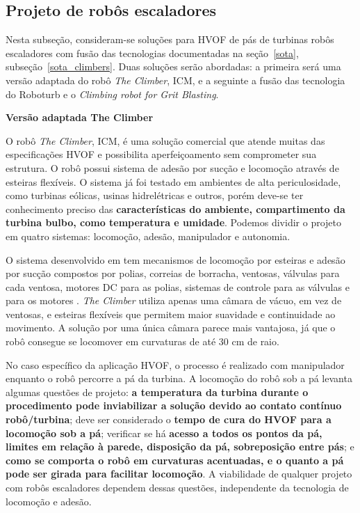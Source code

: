 \subsection{Projeto de robôs escaladores}\label{proj_climbers}

Nesta subseção, consideram-se soluções para HVOF de pás de turbinas robôs
escaladores com fusão das tecnologias documentadas na
seção~\ref{sota}, subseção~\ref{sota_climbers}. Duas soluções serão abordadas:
a primeira será uma versão adaptada do robô \emph{The Climber}, ICM, e a
seguinte a fusão das tecnologia do Roboturb e o \emph{Climbing robot for Grit
Blasting}.

\textbf{Versão adaptada The Climber}  

O robô \emph{The Climber}, ICM, é uma solução comercial que atende muitas das
especificações HVOF e possibilita aperfeiçoamento sem comprometer sua
estrutura. O robô possui sistema de adesão por sucção e locomoção através de
esteiras flexíveis. O sistema já foi testado em ambientes de alta
periculosidade, como turbinas eólicas, usinas hidrelétricas e outros, porém
deve-se ter conhecimento preciso das \textbf{características do ambiente,
compartimento da turbina bulbo, como temperatura e umidade}. Podemos dividir o
projeto em quatro sistemas: locomoção, adesão, manipulador e autonomia.

O sistema desenvolvido em \cite{kim2008development} tem mecanismos de
locomoção por esteiras e adesão por sucção compostos por polias, correias de
borracha, ventosas, válvulas para cada ventosa, motores DC para as polias,
sistemas de controle para as válvulas e para os motores . \emph{The Climber}
utiliza apenas uma câmara de vácuo, em vez de ventosas, e esteiras flexíveis que
permitem maior suavidade e continuidade ao movimento. A solução por uma única
câmara parece mais vantajosa, já que o robô consegue se locomover em curvaturas
de até 30 cm de raio.

No caso específico da aplicação HVOF, o processo é realizado com
manipulador enquanto o robô percorre a pá da turbina. A locomoção do
robô sob a pá levanta algumas questões de projeto: \textbf{a
temperatura da turbina durante o procedimento pode inviabilizar a solução
devido ao contato contínuo robô/turbina}; deve ser considerado o \textbf{tempo
de cura do HVOF para a locomoção sob a pá}; verificar se há \textbf{acesso a
todos os pontos da pá, limites em relação à parede, disposição da pá,
sobreposição entre pás}; e \textbf{como se comporta o robô em curvaturas
acentuadas, e o quanto a pá pode ser girada para facilitar locomoção}. A
viabilidade de qualquer projeto com robôs escaladores dependem dessas questões,
independente da tecnologia de locomoção e adesão.


